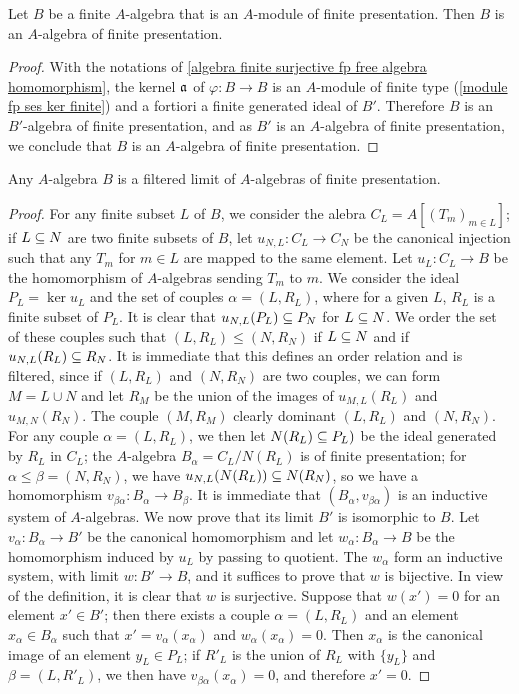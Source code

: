 \begin{corollary}\label{algebra finite fp as module then fp as ring}
Let $B$ be a finite $A$-algebra that is an $A$-module of finite presentation. Then $B$ is an $A$-algebra of finite presentation.
\end{corollary}
\begin{proof}
With the notations of \cref{algebra finite surjective fp free algebra homomorphism}, the kernel $\mathfrak{a}$ of $\varphi:B\to B$ is an $A$-module of finite type (\cref{module fp ses ker finite}) and a fortiori a finite generated ideal of $B'$. Therefore $B$ is an $B'$-algebra of finite presentation, and as $B'$ is an $A$-algebra of finite presentation, we conclude that $B$ is an $A$-algebra of finite presentation.  
\end{proof}
\begin{proposition}\label{algebra is limit of fp algebra}
Any $A$-algebra $B$ is a filtered limit of $A$-algebras of finite presentation.
\end{proposition}
\begin{proof}
For any finite subset $L$ of $B$, we consider the alebra $C_L=A[(T_m)_{m\in L}]$; if $L\subseteq N$ are two finite subsets of $B$, let $u_{N,L}:C_L\to C_N$ be the canonical injection such that any $T_m$ for $m\in L$ are mapped to the same element. Let $u_L:C_L\to B$ be the homomorphism of $A$-algebras sending $T_m$ to $m$. We consider the ideal $P_L=\ker u_L$ and the set of couples $\alpha=(L,R_L)$, where for a given $L$, $R_L$ is a finite subset of $P_L$. It is clear that $u_{N,L}(P_L)\subseteq P_N$ for $L\subseteq N$. We order the set of these couples such that $(L,R_L)\leq(N,R_N)$ if $L\subseteq N$ and if $u_{N,L}(R_L)\subseteq R_N$. It is immediate that this defines an order relation and is filtered, since if $(L,R_L)$ and $(N,R_N)$ are two couples, we can form $M=L\cup N$ and let $R_M$ be the union of the images of $u_{M,L}(R_L)$ and $u_{M,N}(R_N)$. The couple $(M,R_M)$ clearly dominant $(L,R_L)$ and $(N,R_N)$. For any couple $\alpha=(L,R_L)$, we then let $N(R_L)\subseteq P_L)$ be the ideal generated by $R_L$ in $C_L$; the $A$-algebra $B_\alpha=C_L/N(R_L)$ is of finite presentation; for $\alpha\leq\beta=(N,R_N)$, we have $u_{N,L}(N(R_L))\subseteq N(R_N)$, so we have a homomorphism $v_{\beta\alpha}:B_\alpha\to B_\beta$. It is immediate that $(B_\alpha,v_{\beta\alpha})$ is an inductive system of $A$-algebras. We now prove that its limit $B'$ is isomorphic to $B$. Let $v_\alpha:B_\alpha\to B'$ be the canonical homomorphism and let $w_\alpha:B_\alpha\to B$ be the homomorphism induced by $u_L$ by passing to quotient. The $w_\alpha$ form an inductive system, with limit $w:B'\to B$, and it suffices to prove that $w$ is bijective. In view of the definition, it is clear that $w$ is surjective. Suppose that $w(x')=0$ for an element $x'\in B'$; then there exists a couple $\alpha=(L,R_L)$ and an element $x_\alpha\in B_\alpha$ such that $x'=v_\alpha(x_\alpha)$ and $w_\alpha(x_\alpha)=0$. Then $x_\alpha$ is the canonical image of an element $y_L\in P_L$; if $R'_L$ is the union of $R_L$ with $\{y_L\}$ and $\beta=(L,R'_L)$, we then have $v_{\beta\alpha}(x_\alpha)=0$, and therefore $x'=0$.
\end{proof}
